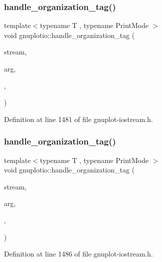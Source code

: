 \subsubsection{\texorpdfstring{handle\+\_\+organization\+\_\+tag()}{handle\_organization\_tag()}\hspace{0.1cm}{\footnotesize\ttfamily [2/5]}}
{\footnotesize\ttfamily template$<$typename T , typename Print\+Mode $>$ \\
void gnuplotio\+::handle\+\_\+organization\+\_\+tag (\begin{DoxyParamCaption}\item[{std\+::ostream \&}]{stream,  }\item[{const T \&}]{arg,  }\item[{\hyperlink{structgnuplotio_1_1_mode2_d}{Mode2D}}]{,  }\item[{Print\+Mode}]{ }\end{DoxyParamCaption})}



Definition at line 1481 of file gnuplot-\/iostream.\+h.

\mbox{\label{namespacegnuplotio_a99e6125b97bc2ca4241f6275d83f05d4}} 
\subsubsection{\texorpdfstring{handle\+\_\+organization\+\_\+tag()}{handle\_organization\_tag()}\hspace{0.1cm}{\footnotesize\ttfamily [3/5]}}
{\footnotesize\ttfamily template$<$typename T , typename Print\+Mode $>$ \\
void gnuplotio\+::handle\+\_\+organization\+\_\+tag (\begin{DoxyParamCaption}\item[{std\+::ostream \&}]{stream,  }\item[{const T \&}]{arg,  }\item[{\hyperlink{structgnuplotio_1_1_mode1_d_unwrap}{Mode1\+D\+Unwrap}}]{,  }\item[{Print\+Mode}]{ }\end{DoxyParamCaption})}



Definition at line 1486 of file gnuplot-\/iostream.\+h.

